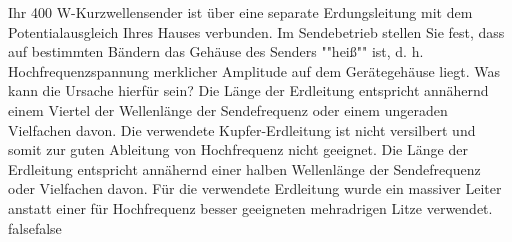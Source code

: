     {Ihr 400 W-Kurzwellensender ist über eine separate Erdungsleitung mit dem Potentialausgleich Ihres Hauses verbunden. Im Sendebetrieb stellen Sie fest, dass auf bestimmten Bändern das Gehäuse des Senders ""heiß"" ist, d. h. Hochfrequenzspannung merklicher Amplitude auf dem Gerätegehäuse liegt. Was kann die Ursache hierfür sein?}
    {Die Länge der Erdleitung entspricht annähernd einem Viertel der Wellenlänge der
Sendefrequenz oder einem ungeraden Vielfachen davon.}
    {Die verwendete Kupfer-Erdleitung ist nicht versilbert und somit zur guten Ableitung von Hochfrequenz nicht geeignet.}
    {Die Länge der Erdleitung entspricht annähernd einer halben Wellenlänge der Sendefrequenz oder Vielfachen davon.}
    {Für die verwendete Erdleitung wurde ein massiver Leiter anstatt einer für Hochfrequenz besser geeigneten mehradrigen Litze verwendet.}
    {false}{false}